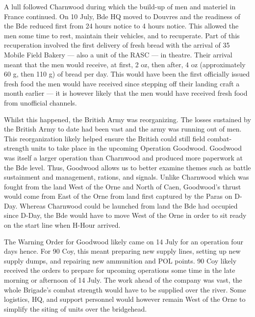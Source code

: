 \documentclass[noraggedright]{turabian-researchpaper}
\begin{document}
A lull followed Charnwood during which the build-up of men and materiel in 
France continued.  On 10 July, Bde HQ moved to Douvres and the readiness of 
the Bde reduced first from 24 hours notice to 4 hours notice.  This allowed 
the men some time to rest, maintain their vehicles, and to recuperate.  Part 
of this recuperation involved the first delivery of fresh bread with the 
arrival of 35 Mobile Field Bakery --- also a unit of the RASC --- in theatre.
Their arrival meant that the men would receive, at first, 2 oz, then after, 4 
oz (approximately 60 g, then 110 g) of bread per day.  %
This would have been 
the first officially issued fresh food the men would have received since 
stepping off their landing craft a month earlier --- it is however likely 
that the men would have received fresh food from unofficial channels.


Whilst this happened, the British Army was reorganizing.  The losses 
sustained by the British Army to date had been vast and the army was running 
out of men.  This reorganization likely helped ensure the British could still 
field combat-strength units  to take place in the upcoming Operation 
Goodwood.\autocite[56-8]{cracks} Goodwood was itself a larger operation than 
Charnwood and produced more paperwork at the Bde level.  Thus, Goodwood 
allows us to better examine themes such as battle sustainment and management, 
rations, and signals.  Unlike %
Charnwood which was fought from the land West of the Orne and North of Caen, 
Goodwood's thrust would come from East of the Orne from land first captured 
by the Paras on D-Day.  Whereas Charnwood could be launched from land the Bde 
had occupied since D-Day, the Bde would have to move West of the Orne in 
order to sit ready on the start line when H-Hour arrived.

The Warning Order for Goodwood likely came on 14 July for an operation four 
days hence.\autocites
[Assumption made because Bde held a conference on 14 July.][14 July 1944]{27wd}
For 90 Coy, this meant preparing new supply lines, setting up new supply 
dumps, and repairing new ammunition and POL points.\autocite[14 July 1944]
{90wd} %
90 Coy likely received the orders to prepare for upcoming operations some time
in the late morning or afternoon of 14 July.  The work ahead of the company 
was vast, the whole Brigade's combat strength would have to be supplied over
the river.  Some logistics, HQ, and support personnel would however remain
West of the Orne to simplify the siting of units over the bridgehead.
\end{document}
